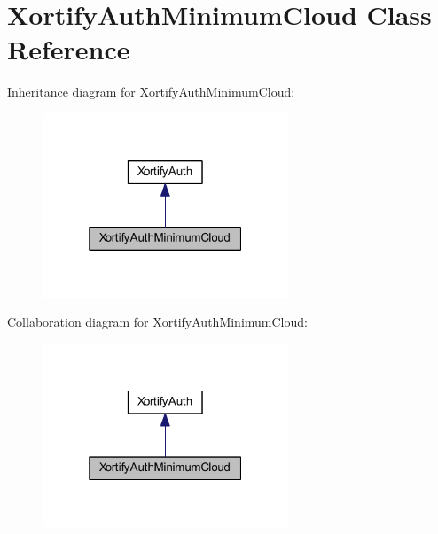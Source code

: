 \hypertarget{class_xortify_auth_minimum_cloud}{\section{Xortify\-Auth\-Minimum\-Cloud Class Reference}
\label{class_xortify_auth_minimum_cloud}
}


Inheritance diagram for Xortify\-Auth\-Minimum\-Cloud\-:
\nopagebreak
\begin{figure}[H]
\begin{center}
\leavevmode
\includegraphics[width=208pt]{class_xortify_auth_minimum_cloud__inherit__graph}
\end{center}
\end{figure}


Collaboration diagram for Xortify\-Auth\-Minimum\-Cloud\-:
\nopagebreak
\begin{figure}[H]
\begin{center}
\leavevmode
\includegraphics[width=208pt]{class_xortify_auth_minimum_cloud__coll__graph}
\end{center}
\end{figure}
